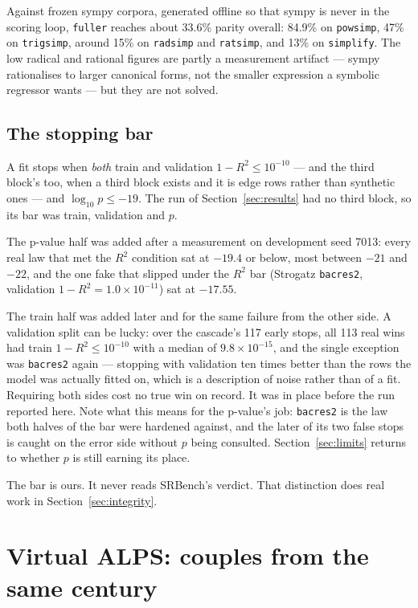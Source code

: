 \documentclass[11pt,a4paper]{article}
\begin{document}
Against frozen sympy corpora, generated offline so that sympy is never in the
scoring loop, \texttt{fuller} reaches about 33.6\% parity overall: 84.9\% on
\texttt{powsimp}, 47\% on \texttt{trigsimp}, around 15\% on \texttt{radsimp}
and \texttt{ratsimp}, and 13\% on \texttt{simplify}. The low radical and rational
figures are partly a measurement artifact --- sympy rationalises to larger
canonical forms, not the smaller expression a symbolic regressor wants --- but
they are not solved.

\subsection{The stopping bar}
\label{sec:stopbar}

A fit stops when \emph{both} train and validation $1 - R^2 \le 10^{-10}$ --- and
the third block's too, when a third block exists and it is edge rows rather than
synthetic ones --- and $\log_{10} p \le -19$. The run of
Section~\ref{sec:results} had no third block, so its bar was train, validation
and $p$.

The p-value half was added after a measurement on development seed 7013: every
real law that met the $R^2$ condition sat at $-19.4$ or below, most between $-21$
and $-22$, and the one fake that slipped under the $R^2$ bar (Strogatz
\texttt{bacres2}, validation $1-R^2 = 1.0\times10^{-11}$) sat at $-17.55$.

The train half was added later and for the same failure from the other side. A
validation split can be lucky: over the cascade's 117 early stops, all 113 real
wins had train $1-R^2 \le 10^{-10}$ with a median of $9.8\times10^{-15}$, and
the single exception was \texttt{bacres2} again --- stopping with validation ten
times better than the rows the model was actually fitted on, which is a
description of noise rather than of a fit. Requiring both sides cost no true win
on record. It was in place before the run reported here. Note what this means
for the p-value's job: \texttt{bacres2} is the law both halves of the bar were
hardened against, and the later of its two false stops is caught on the error
side without $p$ being consulted. Section~\ref{sec:limits} returns to whether
$p$ is still earning its place.

The bar is ours. It never reads SRBench's verdict. That distinction does real
work in Section~\ref{sec:integrity}.

\section{Virtual ALPS: couples from the same century}
\label{sec:alps}
\end{document}
